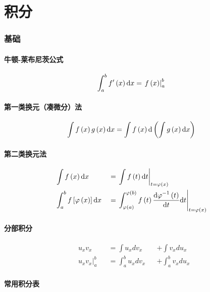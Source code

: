 \documentclass{article}
\begin{document}
\part{积分}

\section{基础}

\subsection{牛顿-莱布尼茨公式}

\[\int_a^b{f^\prime\left(x\right)\mathrm d x}=\left.f\left(x\right)\right|_a^b\]

\subsection{第一类换元（凑微分）法}

\[\int f\left(x\right)g\left(x\right)\mathrm d x=\int f\left(x\right)\mathrm d\left(\int g\left(x\right)\mathrm d x\right)\]

\subsection{第二类换元法}

\[\begin{aligned}
         & \int f\left(x\right)\mathrm d x                        &  & =\left.\int f\left(t\right)\mathrm d t\right|_{t=\varphi\left(x\right)}                                                                         \\
         & \int_a^bf\left[\varphi\left(x\right)\right]\mathrm d x &  & =\left.\int_{\varphi\left(a\right)}^{\varphi\left(b\right)}{f\left(t\right)\frac{{\mathrm d\varphi}^{-1}\left(t\right)}{ \mathrm d t}\mathrm d t}\right|_{t=\varphi\left(x\right)}
    \end{aligned}\]

\subsection{分部积分}

\[\begin{aligned}
         & u_xv_x                  &  & =\int{u_xdv_x}     &  & +\int{v_xdu_x}     \\
         & \left.u_xv_x\right|_a^b &  & =\int_a^b{u_xdv_x} &  & +\int_a^b{v_xdu_x}\end{aligned}\]

\subsection{常用积分表}
\end{document}

